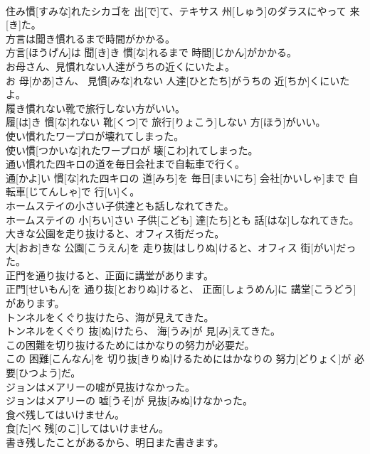\documentclass[8pt]{extreport}
\begin{document}
\begin{CJK}{UTF8}{min}
\\	住み慣[すみな]れたシカゴを 出[で]て、テキサス 州[しゅう]のダラスにやって 来[き]た。
\\	方言は聞き慣れるまで時間がかかる。	
\\	方言[ほうげん]は 聞[き]き 慣[な]れるまで 時間[じかん]がかかる。
\\	お母さん、見慣れない人達がうちの近くにいたよ。	
\\	お 母[かあ]さん、 見慣[みな]れない 人達[ひとたち]がうちの 近[ちか]くにいたよ。
\\	履き慣れない靴で旅行しない方がいい。	
\\	履[は]き 慣[な]れない 靴[くつ]で 旅行[りょこう]しない 方[ほう]がいい。
\\	使い慣れたワープロが壊れてしまった。	
\\	使い慣[つかいな]れたワープロが 壊[こわ]れてしまった。
\\	通い慣れた四キロの道を毎日会社まで自転車で行く。	
\\	通[かよ]い 慣[な]れた四キロの 道[みち]を 毎日[まいにち] 会社[かいしゃ]まで 自転車[じてんしゃ]で 行[い]く。
\\	ホームステイの小さい子供達とも話しなれてきた。	
\\	ホームステイの 小[ちい]さい 子供[こども] 達[たち]とも 話[はな]しなれてきた。
\\	大きな公園を走り抜けると、オフィス街だった。	
\\	大[おお]きな 公園[こうえん]を 走り抜[はしりぬ]けると、オフィス 街[がい]だった。
\\	正門を通り抜けると、正面に講堂があります。	
\\	正門[せいもん]を 通り抜[とおりぬ]けると、 正面[しょうめん]に 講堂[こうどう]があります。
\\	トンネルをくぐり抜けたら、海が見えてきた。	
\\	トンネルをくぐり 抜[ぬ]けたら、 海[うみ]が 見[み]えてきた。
\\	この困難を切り抜けるためにはかなりの努力が必要だ。	
\\	この 困難[こんなん]を 切り抜[きりぬ]けるためにはかなりの 努力[どりょく]が 必要[ひつよう]だ。
\\	ジョンはメアリーの嘘が見抜けなかった。	
\\	ジョンはメアリーの 嘘[うそ]が 見抜[みぬ]けなかった。
\\	食べ残してはいけません。	
\\	食[た]べ 残[のこ]してはいけません。
\\	書き残したことがあるから、明日また書きます。	

\end{CJK}
\end{document}
